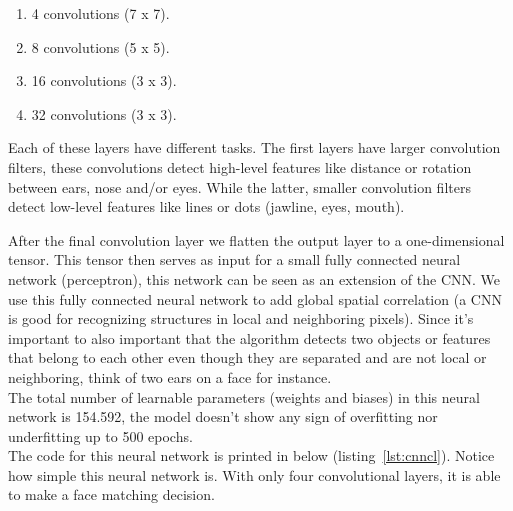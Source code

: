 \begin{enumerate}
  \item 4 convolutions (7 x 7).
  \item 8 convolutions (5 x 5).
  \item 16 convolutions (3 x 3).
  \item 32 convolutions (3 x 3).
\end{enumerate}

Each of these layers have different tasks. The first layers have larger convolution filters, these convolutions detect high-level features like distance or rotation between ears, nose and/or eyes. While the latter, smaller convolution filters detect low-level features like lines or dots (jawline, eyes, mouth).

After the final convolution layer we flatten the output layer to a one-dimensional tensor. This tensor then serves as input for a small fully connected neural network (perceptron), this network can be seen as an extension of the CNN. We use this fully connected neural network to add global spatial correlation (a CNN is good for recognizing structures in local and neighboring pixels). Since it's important to also important that the algorithm detects two objects or features that belong to each other even though they are separated and are not local or neighboring, think of two ears on a face for instance.\\

The total number of learnable parameters (weights and biases) in this neural network is 154.592, the model doesn't show any sign of overfitting nor underfitting up to 500 epochs.\\

The code for this neural network is printed in below (listing~\ref{lst:cnncl}). Notice how simple this neural network is. With only four convolutional layers, it is able to make a face matching decision.

